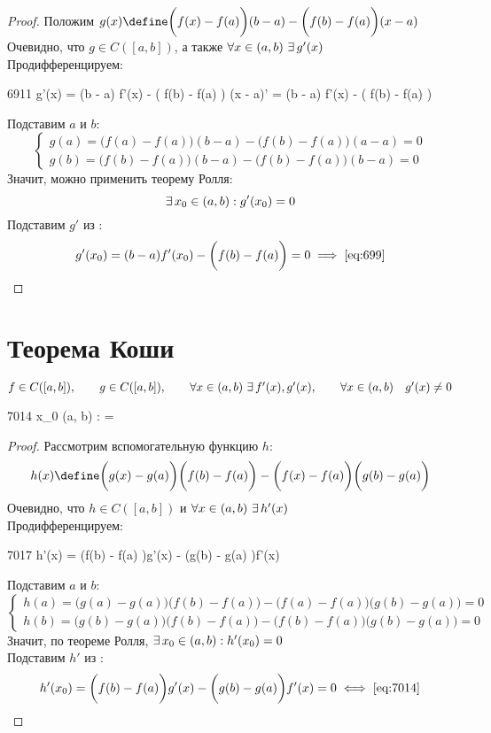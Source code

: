 \begin{proof}
	Положим $ g(x) \define \bigg( f(x) - f(a) \bigg)(b - a) - \bigg(f(b) - f(a) \bigg)(x - a) $ \\
	Очевидно, что $ g \in C([a,b]) $, а также $ \forall x \in (a, b) ~ \exists\, g'(x) $ \\
	Продифференцируем:
	\begin{equ}{6911}
		g'(x) = (b - a) \cdot f'(x) - \bigg( f(b) - f(a) \bigg) \cdot (x - a)' = (b - a) \cdot f'(x) - \bigg( f(b) - f(a) \bigg)
	\end{equ}
	Подставим $a$ и $b$:
	$$ \begin{cases}
		g(a) = \bigg(f(a) - f(a) \bigg)(b - a) - \bigg(f(b) - f(a) \bigg)(a - a) = 0 \\
		g(b) = \bigg( f(b) - f(a) \bigg)(b - a) - \bigg(f(b) - f(a) \bigg)(b - a) = 0
	\end{cases} $$
	Значит, можно применить теорему Ролля:
	$$ \exists\, x_0 \in (a, b) : g'(x_0) = 0 $$
	Подставим $g'$ из :
	$$ g'(x_0) = (b - a)f'(x_0) - \bigg( f(b) - f(a) \bigg) = 0 \implies \eref{699} $$
\end{proof}

\section{Теорема Коши}

\begin{theorem}
	$ f \in C([a, b]), \qquad g \in C([a, b]), \qquad \forall x \in (a, b) ~ \exists\, f'(x), g'(x), \qquad \forall x \in (a, b) \quad g'(x) \ne 0 $
	\begin{equ}{7014}
		\implies \exist x_0 \in (a, b) :  = 
	\end{equ}
\end{theorem}

\begin{proof}
	Рассмотрим вспомогательную функцию $h$:
	$$ h(x) \define \bigg( g(x) - g(a) \bigg) \bigg( f(b) - f(a) \bigg) - \bigg( f(x) - f(a) \bigg) \bigg( g(b) - g(a) \bigg) $$
	Очевидно, что $h \in C([a, b])$ и $\forall x \in (a, b) ~ \exists\, h'(x)$ \\
	Продифференцируем:
	\begin{equ}{7017}
		h'(x) = \bigg(f(b) - f(a) \bigg)g'(x) - \bigg(g(b) - g(a) \bigg)f'(x)
	\end{equ}
	Подставим $a$ и $b$:
	$$ \begin{cases}
		h(a) = \bigg( g(a) - g(a) \bigg) \bigg( f(b) - f(a) \bigg) - \bigg( f(a) - f(a) \bigg) \bigg( g(b) - g(a) \bigg) = 0 \\
		h(b) = \bigg( g(b) - g(a) \bigg) \bigg( f(b) - f(a) \bigg) - \bigg( f(b) - f(a) \bigg) \bigg( g(b) - g(a) \bigg) = 0
	\end{cases} $$
	Значит, по теореме Ролля, $ \exists\, x_0 \in (a, b) : h'(x_0) = 0 $ \\
	Подставим $h'$ из :
	$$ h'(x_0) = \bigg( f(b) - f(a) \bigg)g'(x) - \bigg( g(b) - g(a) \bigg)f'(x) = 0 \iff \eref{7014} $$
\end{proof}

